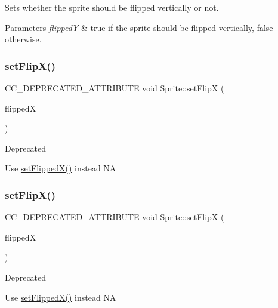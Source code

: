 Sets whether the sprite should be flipped vertically or not.


\begin{DoxyParams}{Parameters}
{\em flippedY} & true if the sprite should be flipped vertically, false otherwise. \\
\hline
\end{DoxyParams}
\mbox{\label{classSprite_ac10f5904c04e3cb5e6e982f88d1e9d04}} 
\subsubsection{\texorpdfstring{set\+Flip\+X()}{setFlipX()}\hspace{0.1cm}{\footnotesize\ttfamily [1/2]}}
{\footnotesize\ttfamily C\+C\+\_\+\+D\+E\+P\+R\+E\+C\+A\+T\+E\+D\+\_\+\+A\+T\+T\+R\+I\+B\+U\+TE void Sprite\+::set\+FlipX (\begin{DoxyParamCaption}\item[{bool}]{flippedX }\end{DoxyParamCaption})\hspace{0.3cm}{\ttfamily [inline]}}

\begin{DoxyRefDesc}{Deprecated}
\item[\hyperlink{deprecated__deprecated000041}{Deprecated}]Use \hyperlink{classSprite_ad18ebe3330284f096db0fc6e16839633}{set\+Flipped\+X()} instead  NA \end{DoxyRefDesc}
\mbox{\label{classSprite_ac10f5904c04e3cb5e6e982f88d1e9d04}} 
\subsubsection{\texorpdfstring{set\+Flip\+X()}{setFlipX()}\hspace{0.1cm}{\footnotesize\ttfamily [2/2]}}
{\footnotesize\ttfamily C\+C\+\_\+\+D\+E\+P\+R\+E\+C\+A\+T\+E\+D\+\_\+\+A\+T\+T\+R\+I\+B\+U\+TE void Sprite\+::set\+FlipX (\begin{DoxyParamCaption}\item[{bool}]{flippedX }\end{DoxyParamCaption})\hspace{0.3cm}{\ttfamily [inline]}}

\begin{DoxyRefDesc}{Deprecated}
\item[\hyperlink{deprecated__deprecated000271}{Deprecated}]Use \hyperlink{classSprite_ad18ebe3330284f096db0fc6e16839633}{set\+Flipped\+X()} instead  NA \end{DoxyRefDesc}
\mbox{\label{classSprite_a69358c4c56221ae9435a4c83074f0151}} 
